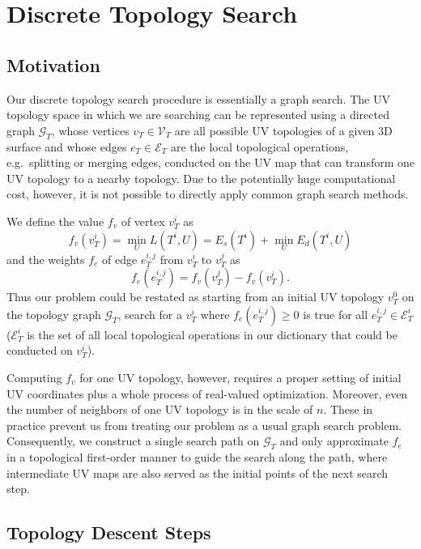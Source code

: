 
\section{Discrete Topology Search}
\label{sec:topologySearch}

\subsection{Motivation}
\label{sec:motivation}

Our discrete topology search procedure is essentially a graph search. 
%
The UV topology space in which we are searching can be represented using a directed graph $\mathcal{G}_T$, whose vertices $v_T \in \mathcal{V}_T$ are all possible UV topologies of a given 3D surface and whose edges $e_T \in \mathcal{E}_T$ are the local topological operations, e.g.\ splitting or merging edges, conducted on the UV map that can transform one UV topology to a nearby topology. 
%
Due to the potentially huge computational cost, however, it is not possible to directly apply common graph search methods.

We define the value $f_v$ of vertex $v^i_T$ as 
\[ f_v(v^i_T) = \min_{U} L(T^i, U) = E_s(T^i) + \min_{U} E_d(T^i, U) \]
and the weights $f_e$ of edge $e^{i,j}_{T}$ from $v^i_T$ to $v^j_T$ as 
\[ f_e(e^{i,j}_T) = f_v(v^j_T) - f_v(v^i_T). \]
Thus our problem could be restated as starting from an initial UV topology $v^0_T$ on the topology graph $\mathcal{G}_T$, search for a $v^i_T$ where $f_e(e^{i,j}_T) \geq 0$ is true for all $e^{i,j}_T \in \mathcal{E}^i_T$ ($\mathcal{E}^i_T$ is the set of all local topological operations in our dictionary that could be conducted on $v^i_T$).

Computing $f_v$ for one UV topology, however, requires a proper setting of initial UV coordinates plus a whole process of real-valued optimization. Moreover, even the number of neighbors of one UV topology is in the scale of $n$. These in practice prevent us from treating our problem as a usual graph search problem. Consequently, we construct a single search path on $\mathcal{G}_T$ and only approximate $f_e$ in a topological first-order manner to guide the search along the path, where intermediate UV maps are also served as the initial points of the next search step.

\subsection{Topology Descent Steps}

